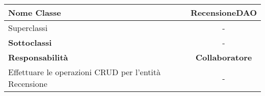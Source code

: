 
\setcounter{table}{0}
\begin{table}[H]
    \centering
    \begin{tabular}{||   l  ||  c   ||}
        \hline
        \rowcolor{Gray}
        \textbf{Nome Classe} & RecensioneDAO\\
        \hline
        Superclassi  &  - \\
        \hline
        \textbf{Sottoclassi} & - \\
        \hline
         \textbf{Responsabilità} & \textbf{Collaboratore} \\
         \hline
          Effettuare le operazioni CRUD per l'entità Recensione & - \\
         \hline
    \end{tabular}
\end{table}
